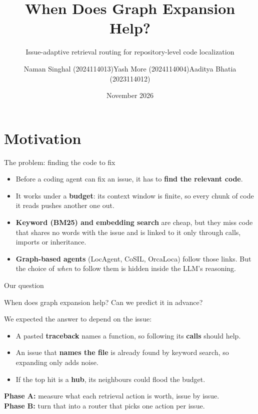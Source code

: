 \documentclass{beamer}
\title{When Does Graph Expansion Help?}
\subtitle{Issue-adaptive retrieval routing for repository-level code localization}
\author{Naman Singhal (2024114013)\newline Yash More (2024114004)\newline Aaditya Bhatia (2023114012)}
\date{November 2026}
\begin{document}
\maketitle

\section{Motivation}

\begin{frame}{The problem: finding the code to fix}
  \begin{itemize}
    \item Before a coding agent can fix an issue, it has to \textbf{find the relevant code}.
    \item It works under a \textbf{budget}: its context window is finite, so every chunk of code it reads pushes another one out.
    \item \textbf{Keyword (BM25) and embedding search} are cheap, but they miss code that shares no words with the issue and is linked to it only through calls, imports or inheritance.
    \item \textbf{Graph-based agents} (LocAgent, CoSIL, OrcaLoca) follow those links. But the choice of \emph{when} to follow them is hidden inside the LLM's reasoning.
  \end{itemize}
\end{frame}

\begin{frame}{Our question}
  \begin{block}{When does graph expansion help? Can we predict it in advance?}
  \end{block}
  \vspace{4pt}
  We expected the answer to depend on the issue:
  \begin{itemize}
    \item A pasted \textbf{traceback} names a function, so following its \textbf{calls} should help.
    \item An issue that \textbf{names the file} is already found by keyword search, so expanding only adds noise.
    \item If the top hit is a \textbf{hub}, its neighbours could flood the budget.
  \end{itemize}
  \vspace{4pt}
  \textbf{Phase A:} measure what each retrieval action is worth, issue by issue.\\
  \textbf{Phase B:} turn that into a router that picks one action per issue.
\end{frame}
\end{document}
